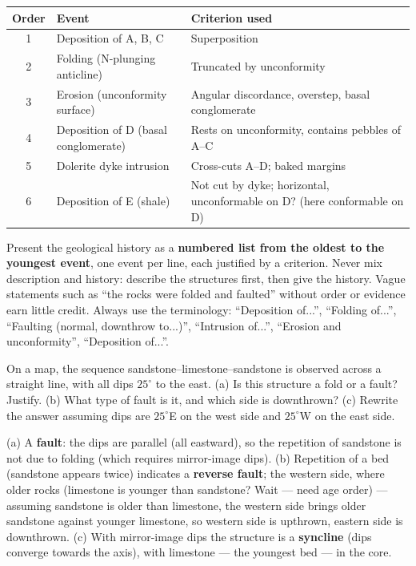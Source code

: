 \documentclass[11pt]{article}
\begin{document}
\begin{center}
\begin{tabularx}{\linewidth}{|c|X|l|}\hline
\rowcolor{popblueL} \textbf{Order} & \textbf{Event} & \textbf{Criterion used} \\ \hline
1 & Deposition of A, B, C & Superposition \\ \hline
2 & Folding (N-plunging anticline) & Truncated by unconformity \\ \hline
3 & Erosion (unconformity surface) & Angular discordance, overstep, basal conglomerate \\ \hline
4 & Deposition of D (basal conglomerate) & Rests on unconformity, contains pebbles of A--C \\ \hline
5 & Dolerite dyke intrusion & Cross-cuts A--D; baked margins \\ \hline
6 & Deposition of E (shale) & Not cut by dyke; horizontal, unconformable on D? (here conformable on D) \\ \hline
\end{tabularx}
\end{center}

\begin{attention}
Present the geological history as a \textbf{numbered list from the oldest to the youngest event}, one event per line, each justified by a criterion. Never mix description and history: describe the structures first, then give the history. Vague statements such as ``the rocks were folded and faulted'' without order or evidence earn little credit. Always use the terminology: ``Deposition of...'', ``Folding of...'', ``Faulting (normal, downthrow to...)'', ``Intrusion of...'', ``Erosion and unconformity'', ``Deposition of...''.
\end{attention}

\begin{exercice}
On a map, the sequence sandstone--limestone--sandstone is observed across a straight line, with all dips $25^{\circ}$ to the east. (a) Is this structure a fold or a fault? Justify. (b) What type of fault is it, and which side is downthrown? (c) Rewrite the answer assuming dips are $25^{\circ}$E on the west side and $25^{\circ}$W on the east side.
\end{exercice}

\begin{corrige}[Exercise 1]
(a) A \textbf{fault}: the dips are parallel (all eastward), so the repetition of sandstone is not due to folding (which requires mirror-image dips). (b) Repetition of a bed (sandstone appears twice) indicates a \textbf{reverse fault}; the western side, where older rocks (limestone is younger than sandstone? Wait — need age order) — assuming sandstone is older than limestone, the western side brings older sandstone against younger limestone, so western side is upthrown, eastern side is downthrown. (c) With mirror-image dips the structure is a \textbf{syncline} (dips converge towards the axis), with limestone — the youngest bed — in the core.
\end{corrige}
\end{document}
